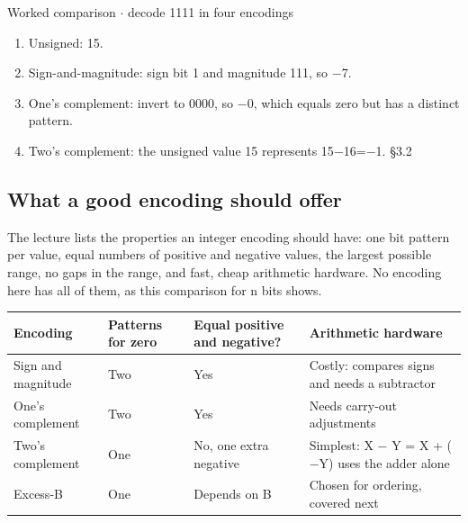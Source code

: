 \documentclass[11pt]{article}
\begin{document}
\begin{keepsection}
\begin{keepsection}
\begin{workedbox}{Worked comparison \ensuremath{\cdot} decode 1111 in four encodings}
\begin{enumerate}
\item Unsigned: 15.
\item Sign-and-magnitude: sign bit 1 and magnitude 111, so \ensuremath{-}7.
\item One’s complement: invert to 0000, so \ensuremath{-}0, which equals zero but has a distinct pattern.
\item Two’s complement: the unsigned value 15 represents 15\ensuremath{-}16=\ensuremath{-}1. \hfill{\small\color{FAUblue}§3.2}
\end{enumerate}
\end{workedbox}
\end{keepsection}

\begin{keepsection}
\subsection{What a good encoding should offer}

The lecture lists the properties an integer encoding should have: one bit pattern per value, equal numbers of positive and negative values, the largest possible range, no gaps in the range, and fast, cheap arithmetic hardware. No encoding here has all of them, as this comparison for n bits shows.

\begin{center}\small\begin{tabularx}{\linewidth}{>{\raggedright\arraybackslash}X>{\raggedright\arraybackslash}X>{\raggedright\arraybackslash}X>{\raggedright\arraybackslash}X}\toprule
\textbf{Encoding} & \textbf{Patterns for zero} & \textbf{Equal positive and negative?} & \textbf{Arithmetic hardware} \\ \midrule
Sign and magnitude & Two & Yes & Costly: compares signs and needs a subtractor \\
One’s complement & Two & Yes & Needs carry-out adjustments \\
Two’s complement & One & No, one extra negative & Simplest: X \ensuremath{-} Y = X + (\ensuremath{-}Y) uses the adder alone \\
Excess-B & One & Depends on B & Chosen for ordering, covered next \\
\bottomrule\end{tabularx}\end{center}
\end{keepsection}


\end{keepsection}
\end{document}
